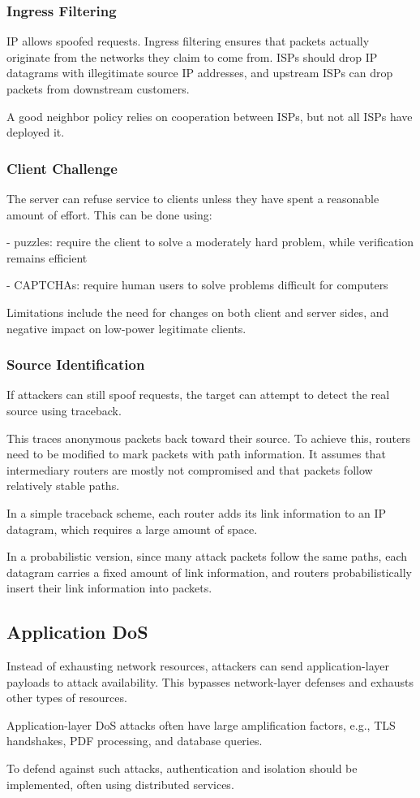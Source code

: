 \subsubsection{Ingress Filtering}
IP allows spoofed requests. Ingress filtering ensures that packets actually originate from the networks they claim to come from. ISPs should drop IP datagrams with illegitimate source IP addresses, and upstream ISPs can drop packets from downstream customers.  

A good neighbor policy relies on cooperation between ISPs, but not all ISPs have deployed it.  

\subsubsection{Client Challenge}
The server can refuse service to clients unless they have spent a reasonable amount of effort. This can be done using:

- puzzles: require the client to solve a moderately hard problem, while verification remains efficient  

- CAPTCHAs: require human users to solve problems difficult for computers  

Limitations include the need for changes on both client and server sides, and negative impact on low-power legitimate clients.  

\subsubsection{Source Identification}
If attackers can still spoof requests, the target can attempt to detect the real source using traceback.  

This traces anonymous packets back toward their source. To achieve this, routers need to be modified to mark packets with path information. It assumes that intermediary routers are mostly not compromised and that packets follow relatively stable paths.  

In a simple traceback scheme, each router adds its link information to an IP datagram, which requires a large amount of space.  

In a probabilistic version, since many attack packets follow the same paths, each datagram carries a fixed amount of link information, and routers probabilistically insert their link information into packets.  

\subsection{Application DoS}
Instead of exhausting network resources, attackers can send application-layer payloads to attack availability. This bypasses network-layer defenses and exhausts other types of resources.  

Application-layer DoS attacks often have large amplification factors, e.g., TLS handshakes, PDF processing, and database queries.  

To defend against such attacks, authentication and isolation should be implemented, often using distributed services.  